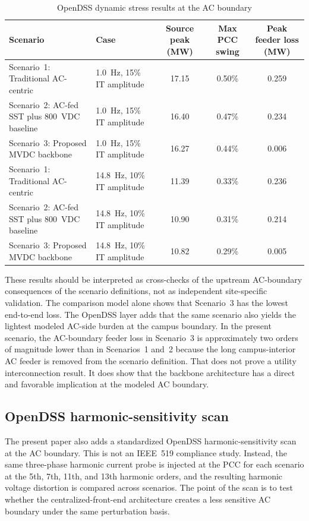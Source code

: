 \documentclass[11pt]{article}
\begin{document}
\begin{table}[t]
    \centering
    \caption{OpenDSS dynamic stress results at the AC boundary}
    \label{tab:opendssstress}
    \begin{tabular}{p{1.55in}p{1.05in}ccc}
        \toprule
        Scenario & Case & Source peak (MW) & Max PCC swing & Peak feeder loss (MW) \\
        \midrule
        Scenario~1: Traditional AC-centric & 1.0~Hz, 15\% IT amplitude & 17.15 & 0.50\% & 0.259 \\
        Scenario~2: AC-fed SST plus 800~VDC baseline & 1.0~Hz, 15\% IT amplitude & 16.40 & 0.47\% & 0.234 \\
        Scenario~3: Proposed MVDC backbone & 1.0~Hz, 15\% IT amplitude & 16.27 & 0.44\% & 0.006 \\
        \midrule
        Scenario~1: Traditional AC-centric & 14.8~Hz, 10\% IT amplitude & 11.39 & 0.33\% & 0.236 \\
        Scenario~2: AC-fed SST plus 800~VDC baseline & 14.8~Hz, 10\% IT amplitude & 10.90 & 0.31\% & 0.214 \\
        Scenario~3: Proposed MVDC backbone & 14.8~Hz, 10\% IT amplitude & 10.82 & 0.29\% & 0.005 \\
        \bottomrule
    \end{tabular}
\end{table}

These results should be interpreted as cross-checks of the upstream AC-boundary consequences of the scenario definitions, not as independent site-specific validation. The comparison model alone shows that Scenario~3 has the lowest end-to-end loss. The OpenDSS layer adds that the same scenario also yields the lightest modeled AC-side burden at the campus boundary. In the present scenario, the AC-boundary feeder loss in Scenario~3 is approximately two orders of magnitude lower than in Scenarios~1 and~2 because the long campus-interior AC feeder is removed from the scenario definition. That does not prove a utility interconnection result. It does show that the backbone architecture has a direct and favorable implication at the modeled AC boundary.

\subsection{OpenDSS harmonic-sensitivity scan}
The present paper also adds a standardized OpenDSS harmonic-sensitivity scan at the AC boundary. This is not an IEEE~519 compliance study. Instead, the same three-phase harmonic current probe is injected at the PCC for each scenario at the 5th, 7th, 11th, and 13th harmonic orders, and the resulting harmonic voltage distortion is compared across scenarios. The point of the scan is to test whether the centralized-front-end architecture creates a less sensitive AC boundary under the same perturbation basis.
\end{document}
